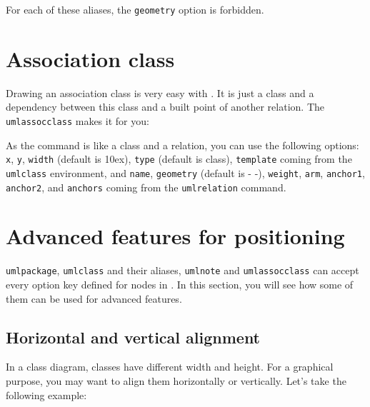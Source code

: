 \documentclass[a4paper,11pt]{report}
\begin{document}
\begin{remark}
For each of these aliases, the {\tt geometry} option is forbidden.
\end{remark}

\section{Association class}

Drawing an association class is very easy with \tuml. It is just a class and a dependency between this class and a built point of another relation. The {\tt umlassocclass} makes it for you:

\medskip

\begin{minipage}{0.4\textwidth}

\end{minipage}
\begin{minipage}{0.6\textwidth}
\begin{center}
\end{center}
\end{minipage}

\medskip

As the command is like a class and a relation, you can use the following options: {\tt x}, {\tt y}, {\tt width} (default is 10ex), {\tt type} (default is class), {\tt template} coming from the {\tt umlclass} environment, and {\tt name}, {\tt geometry} (default is - -), {\tt weight}, {\tt arm}, {\tt anchor1}, {\tt anchor2}, and {\tt anchors} coming from the {\tt umlrelation} command.

\section{Advanced features for positioning}\label{s.advfeat}

{\tt umlpackage}, {\tt umlclass} and their aliases, {\tt umlnote} and {\tt umlassocclass} can accept every option key defined for nodes in \TikZ.
In this section, you will see how some of them can be used for advanced features.

\subsection{Horizontal and vertical alignment}\label{ss.hvalign}

In a class diagram, classes have different width and height. For a graphical purpose, you may want to align them horizontally or vertically. Let's take the following example:
\end{document}
